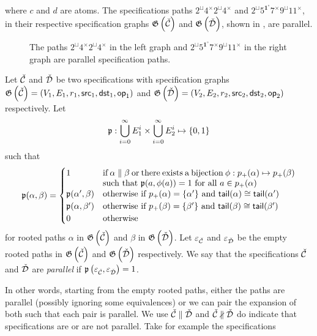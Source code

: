 where $c$ and $d$ are atoms. The specifications paths $2^\sqcup4^\times2^\sqcup4^\times$ and $2^\sqcup5^{\mathbf{1}^\circ}7^\times9^\sqcup11^\times$, in their respective specification graphs $\mathfrak{G}\left(\check{\mathcal{C}}\right)$ and $\mathfrak{G}\left(\check{\mathcal{D}}\right)$, shown in , are parallel.
\begin{figure}[ht!]
    \centering
    
    \caption{The paths $2^\sqcup4^\times2^\sqcup4^\times$ in the left graph and $2^\sqcup5^{\mathbf{1}^\circ}7^\times9^\sqcup11^\times$ in the right graph are parallel specification paths.}
    \label{fig:para_path}
\end{figure}
\begin{definition}\label{def:parspec}
Let $\check{\mathcal{C}}$ and $\check{\mathcal{D}}$ be two specifications with specification graphs $\mathfrak{G}\left(\check{\mathcal{C}}\right) = (V_1,E_1,r_1,\textsf{src}_1,\textsf{dst}_1,\textsf{op}_1)$ and $\mathfrak{G}\left(\check{\mathcal{D}}\right) = (V_2,E_2,r_2,\textsf{src}_2,\textsf{dst}_2,\textsf{op}_2)$ respectively. Let 
\[
    \mathfrak{p}: \bigcup_{i=0}^\infty E_1^i \times \bigcup_{i=0}^\infty E_2^i \mapsto \left\{0,1\right\}
\]
such that
\[
\mathfrak{p}(\alpha,\beta) = \begin{cases}
1 & \parbox[t]{.65\textwidth}{if $\alpha \parallel \beta$ or there exists a bijection $\phi: p_+(\alpha) \mapsto p_+(\beta)$ such that $\mathfrak{p}(a,\phi(a)) = 1$ for all $a\in p_+(\alpha)$}\\
\mathfrak{p}(\alpha',\beta) & \parbox[t]{.65\textwidth}{otherwise if $p_+(\alpha) = \set{\alpha'}$ and $\textsf{tail}(\alpha) \cong \textsf{tail}(\alpha')$}\\
\mathfrak{p}(\alpha,\beta') & \parbox[t]{.65\textwidth}{otherwise if $p_+(\beta) = \set{\beta'}$ and $\textsf{tail}(\beta) \cong \textsf{tail}(\beta')$}\\
0 & \text{otherwise}
\end{cases}
\]
for rooted paths $\alpha$ in $\mathfrak{G}\left(\check{\mathcal{C}}\right)$ and $\beta$ in $\mathfrak{G}\left(\check{\mathcal{D}}\right)$. Let $\varepsilon_{\check{\mathcal{C}}}$ and $\varepsilon_{\check{\mathcal{D}}}$ be the empty rooted paths in $\mathfrak{G}\left(\check{\mathcal{C}}\right)$ and $\mathfrak{G}\left(\check{\mathcal{D}}\right)$ respectively. We say that the specifications $\check{\mathcal{C}}$ and $\check{\mathcal{D}}$ are \emph{parallel} if $\mathfrak{p}\left(\varepsilon_{\check{\mathcal{C}}},\varepsilon_{\check{\mathcal{D}}}\right) = 1$.
\end{definition}
In other words, starting from the empty rooted paths, either the paths are parallel (possibly ignoring some equivalences) or we can pair the expansion of both such that each pair is parallel. We use $\check{\mathcal{C}} \parallel \check{\mathcal{D}}$ and $\check{\mathcal{C}} \nparallel \check{\mathcal{D}}$ do indicate that specifications are or are not parallel. Take for example the specifications
